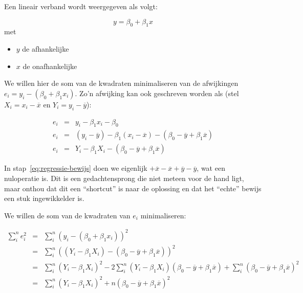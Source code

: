 \begin{theorem}

  Een lineair verband wordt weergegeven als volgt:

  \begin{equation}
    y = \beta_{0} + \beta_{1} x
    \label{eq:lineair}
  \end{equation}
  met
  \begin{itemize}
    \item $y$ de afhankelijke
    \item $x$ de onafhankelijke
  \end{itemize}

  We willen hier de som van de kwadraten minimaliseren van de afwijkingen $e_{i} = y_{i} - (\beta_{0} + \beta_{1}x_{i})$. Zo'n afwijking kan ook geschreven worden als (stel $X_{i} = x_{i} - \overline{x}$ en $Y_{i} = y_{i} - \overline{y}$):

  \begin{eqnarray}
    e_{i} & = & y_{i} - \beta_{1} x_{i} - \beta_{0} \\
    e_{i} & = & (y_{i} - \overline{y}) - \beta_{1}(x_{i} - \overline{x}) - (\beta_{0} - \overline{y} + \beta_{1} \overline{x}) \\
    \label{eq:regressie-bewijs}
    e_{i} & = & Y_{i} - \beta_{1} X_{i} - (\beta_{0} - \overline{y} + \beta_{1} \overline{x})
  \end{eqnarray}

  In stap~\ref{eq:regressie-bewijs} doen we eigenlijk $+\overline{x}-\overline{x}+\overline{y}-\overline{y}$, wat een nuloperatie is. Dit is een gedachtensprong die niet meteen voor de hand ligt, maar onthou dat dit een ``shortcut'' is naar de oplossing en dat het ``echte'' bewijs een stuk ingewikkelder is.

  We willen de som van de kwadraten van $e_i$  minimaliseren:

  \begin{eqnarray}
    \sum_{i}^{n} e_{i}^{2} & =& \sum_{i}^{n} (y_{i} - (\beta_{0} + \beta_{1}x_{i}))^{2}\\
    & = & \sum_{i}^{n} ((Y_{i} - \beta_{1} X_{i}) - (\beta_{0} - \overline{y} + \beta_{1}\overline{x}))^{2}\\
    & = & \sum_{i}^{n}(Y_{i} - \beta_{1} X_{i})^2 - 2 \sum_{i}^{n}(Y_i - \beta_1 X_i)(\beta_0 - \overline{y}+ \beta_1\overline{x}) + \sum_{i}^{n}(\beta_{0} - \overline{y} + \beta_{1}\overline{x})^{2} \label{eq:stap1}\\
    & = & \sum_{i}^{n}(Y_{i} - \beta_{1} X_{i})^{2} + n(\beta_{0} - \overline{y} + \beta_{1} \overline{x})^{2} \label{eq:stap2}
  \end{eqnarray}
	

\end{theorem}
